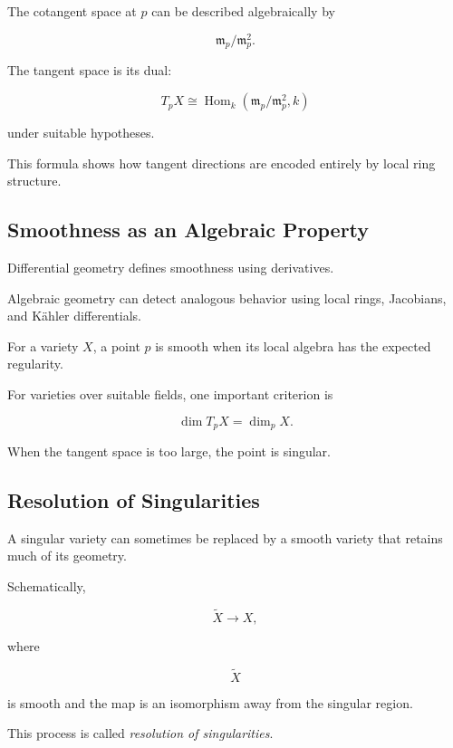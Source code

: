 The cotangent space at \(p\) can be described algebraically by

\[
\boxed{
\mathfrak m_p/\mathfrak m_p^2.
}
\]

The tangent space is its dual:

\[
\boxed{
T_pX
\cong
\operatorname{Hom}_k
\left(
\mathfrak m_p/\mathfrak m_p^2,
k
\right)
}
\]

under suitable hypotheses.

This formula shows how tangent directions are encoded entirely by local
ring structure.

\subsection{Smoothness as an Algebraic Property}
\label{subsec:algebraic-smoothness}

Differential geometry defines smoothness using derivatives.

Algebraic geometry can detect analogous behavior using local rings,
Jacobians, and K\"ahler differentials.

For a variety \(X\), a point \(p\) is smooth when its local algebra has the
expected regularity.

For varieties over suitable fields, one important criterion is

\[
\boxed{
\dim T_pX=\dim_pX.
}
\]

When the tangent space is too large, the point is singular.

\subsection{Resolution of Singularities}
\label{subsec:resolution-singularities}

A singular variety can sometimes be replaced by a smooth variety that
retains much of its geometry.

Schematically,

\[
\boxed{
\widetilde{X}
\longrightarrow
X,
}
\]

where

\[
\widetilde{X}
\]

is smooth and the map is an isomorphism away from the singular region.

This process is called \emph{resolution of singularities}.

